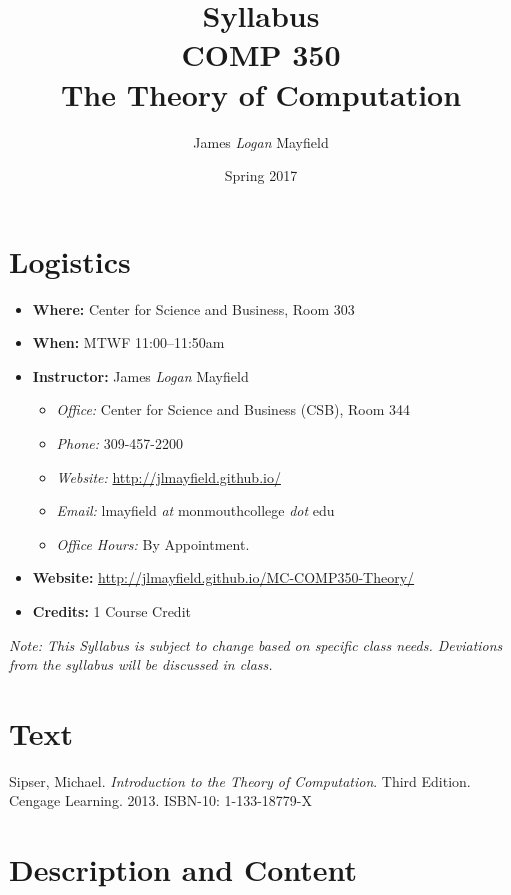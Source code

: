 \documentclass[10pt]{article}
\title{Syllabus \\ COMP 350 \\ The Theory of Computation}
\author{ James \textit{Logan} Mayfield }
\date{ Spring 2017 }
\begin{document}
\maketitle

\section{Logistics}
\begin{itemize}
\item \textbf{Where: } Center for Science and Business, Room 303
\item \textbf{When: } MTWF 11:00--11:50am
\item \textbf{Instructor: } James \textit{Logan} Mayfield\begin{itemize}
\item \textit{Office: } Center for Science and Business (CSB), Room 344
\item \textit{Phone: } 309-457-2200 %
\item \textit{Website: } \url{http://jlmayfield.github.io/}
\item \textit{Email: } lmayfield \textit{at} monmouthcollege \textit{dot} edu
\item \textit{Office Hours: }  By Appointment.
\end{itemize}
\item \textbf{Website: } \url{http://jlmayfield.github.io/MC-COMP350-Theory/}
\item \textbf{Credits: } 1 Course Credit
\end{itemize}
\emph{Note: This Syllabus is subject to change based on specific class needs. Deviations from the syllabus will be discussed in class.}


\section{Text}

Sipser, Michael. \textit{Introduction to the Theory of Computation}. Third Edition. Cengage Learning. 2013. ISBN-10: 1-133-18779-X %


\section{Description and Content}
\end{document}

